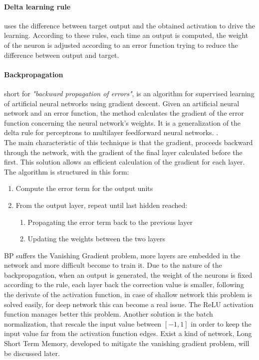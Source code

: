 \documentclass[%
    corpo=12pt,
    twoside,
    oldstyle,
    autoretitolo,
    greek,
    evenboxes,
]{toptesi}
\begin{document}
\paragraph{Delta learning rule} uses the difference between target output and the obtained activation to drive the learning. According to these rules, each time an output is computed, the weight of the neuron is adjusted according to an error function trying to reduce the difference between output and target.

\paragraph{Backpropagation} short for \textit{"backward propagation of errors"}, is an algorithm for supervised learning of artificial neural networks using gradient descent. Given an artificial neural network and an error function, the method calculates the gradient of the error function concerning the neural network's weights. It is a generalization of the delta rule for perceptrons to multilayer feedforward neural networks. \cite{bp}.\\
The main characteristic of this technique is that the gradient, proceeds backward through the network, with the gradient of the final layer calculated before the first. This solution allows an efficient calculation of the gradient for each layer. The algorithm is structured in this form:
\begin{enumerate}
  \item Compute the error term for the output units
  \item From the output layer, repeat until last hidden reached:
  \begin{enumerate}
    \item Propagating the error term back to the previous layer
    \item Updating the weights between the two layers
  \end{enumerate}
\end{enumerate}
BP suffers the Vanishing Gradient problem, more layers are embedded in the network and more difficult become to train it. Due to the nature of the backpropagation, when an output is generated, the weight of the neurons is fixed according to the rule, each layer back the correction value is smaller, following the derivate of the activation function, in case of shallow network this problem is solved easily, for deep network this can become a real issue. The ReLU activation function manages better this problem. Another solution is the batch normalization, that rescale the input value between $[-1,1]$ in order to keep the input value far from the activation function edges. Exist a kind of network, Long Short Term Memory, developed to mitigate the vanishing gradient problem, will be discussed later.
\end{document}

